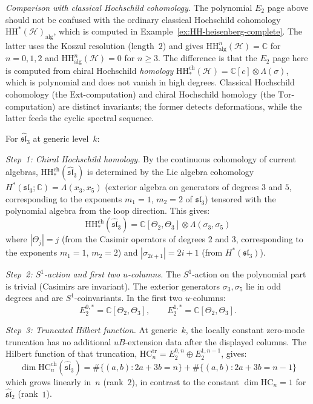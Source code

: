 \begin{example}
\emph{Comparison with classical Hochschild cohomology.}
The polynomial $E_2$ page above should not be confused with the
ordinary classical Hochschild cohomology
$\mathrm{HH}^*(\mathcal{H})_{\mathrm{alg}}$, which is computed in
Example~\ref{ex:HH-heisenberg-complete}. The latter uses the Koszul
resolution (length~$2$) and gives
$\mathrm{HH}^n_{\mathrm{alg}}(\mathcal{H}) = \mathbb{C}$ for
$n = 0, 1, 2$ and
$\mathrm{HH}^n_{\mathrm{alg}}(\mathcal{H}) = 0$ for $n \geq 3$.
The difference is that the $E_2$ page here is computed from chiral
Hochschild \emph{homology}
$\mathrm{HH}^{\mathrm{ch}}_*(\mathcal{H})
= \mathbb{C}[c] \otimes \Lambda(\sigma)$, which is polynomial and
does not vanish in high degrees. Classical Hochschild cohomology
\textup{(}the $\mathrm{Ext}$-computation\textup{)} and chiral
Hochschild homology \textup{(}the $\mathrm{Tor}$-computation\textup{)}
are distinct invariants; the former detects deformations, while the
latter feeds the cyclic spectral sequence.
\end{example}

\begin{example}
\label{ex:E2-sl3}
For $\widehat{\mathfrak{sl}}_3$ at generic level~$k$:

\emph{Step~1: Chiral Hochschild homology.}
By the continuous cohomology of current algebras, $\mathrm{HH}_*^{\mathrm{ch}}(\widehat{\mathfrak{sl}}_3)$ is determined by the Lie algebra cohomology $H^*(\mathfrak{sl}_3; \mathbb{C}) = \Lambda(x_3, x_5)$ (exterior algebra on generators of degrees $3$ and $5$, corresponding to the exponents $m_1 = 1$, $m_2 = 2$ of $\mathfrak{sl}_3$) tensored with the polynomial algebra from the loop direction. This gives:
\[\mathrm{HH}_*^{\mathrm{ch}}(\widehat{\mathfrak{sl}}_3)
= \mathbb{C}[\Theta_2, \Theta_3] \otimes \Lambda(\sigma_3, \sigma_5)\]
where $|\Theta_j| = j$ (from the Casimir operators of degrees $2$ and $3$, corresponding to the exponents $m_1 = 1$, $m_2 = 2$) and $|\sigma_{2i+1}| = 2i+1$ (from $H^*(\mathfrak{sl}_3)$).

\emph{Step~2: $S^1$-action and first two $u$-columns.}
The $S^1$-action on the polynomial part is trivial (Casimirs are invariant).
The exterior generators $\sigma_3, \sigma_5$ lie in odd degrees and are
$S^1$-coinvariants. In the first two $u$-columns:
\[E_2^{0,*} = \mathbb{C}[\Theta_2, \Theta_3], \qquad
E_2^{1,*} = \mathbb{C}[\Theta_2, \Theta_3].\]

\emph{Step~3: Truncated Hilbert function.}
At generic~$k$, the locally constant zero-mode truncation has no
additional $uB$-extension data after the displayed columns. The
Hilbert function of that truncation,
$\mathrm{HC}_n^{\mathrm{tr}} = E_2^{0,n} \oplus E_2^{1,n-1}$, gives:
\[\dim \mathrm{HC}_n^{\mathrm{ch}}(\widehat{\mathfrak{sl}}_3)
= \#\{(a,b) : 2a + 3b = n\} + \#\{(a,b) : 2a + 3b = n-1\}\]
which grows linearly in~$n$ (rank~$2$), in contrast to the constant
$\dim \mathrm{HC}_n = 1$ for $\widehat{\mathfrak{sl}}_2$ (rank~$1$).
\end{example}

